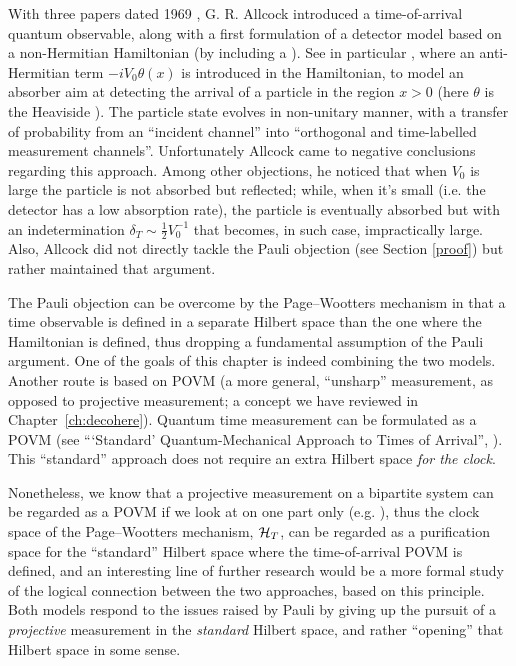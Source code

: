 With three papers dated 1969 \parencite{Allcock-1, Allcock-2, Allcock-3}, G. R. Allcock
introduced a time-of-arrival quantum observable,
along with a first formulation of a detector model based on a non-Hermitian
Hamiltonian (by including a ).
See in particular \cite[\S II-IV]{Allcock-2}, where an anti-Hermitian term
$-iV_0\theta(x)$ is introduced in the Hamiltonian,
to model an absorber aim at detecting
the arrival of a particle in the region $x>0$
(here $\theta$ is the Heaviside ).
The particle state evolves
in non-unitary manner, with a transfer of probability
from an ``incident channel''
into ``orthogonal and time-labelled measurement channels''.
Unfortunately Allcock came to negative conclusions regarding this approach.
Among other objections, he noticed that when $V_0$ is large the particle is not absorbed but reflected;
while, when it's small (i.e. the detector has a low absorption rate), the particle is eventually absorbed but
with an indetermination $\delta_T \sim \frac{1}{2}V_{0}^{-1}$
that becomes, in such case, impractically large.
Also, Allcock did not directly tackle the Pauli objection (see Section \ref{proof})
but rather maintained that argument.

The Pauli objection can be overcome by the Page--Wootters mechanism
in that a time observable is defined in a separate Hilbert space
than the one where the Hamiltonian is defined,
thus dropping a fundamental assumption of the Pauli argument.
One of the goals of this chapter
is indeed combining the two models. Another route is based on POVM
(a more general, ``unsharp'' measurement, as opposed to projective measurement; a concept we have reviewed in Chapter~\ref{ch:decohere}).
Quantum time measurement can be formulated as a POVM
(see ```Standard' Quantum-Mechanical Approach to Times of Arrival'', \cite{TQM1:Standard}).
This ``standard'' approach does not require an extra Hilbert space \emph{for the clock}.

Nonetheless, we know that a projective measurement on a bipartite system
can be regarded as a POVM
if we look at
on one part only (e.g. \cite{Paris2012}),
thus the clock space of the Page--Wootters mechanism, $\mathcal{H}_T$,
can be regarded as a purification space \parencite{Paris2012} for the ``standard''
Hilbert space where the time-of-arrival POVM is defined,
and an interesting line of further research would be a more formal
study of the logical connection between the two approaches, based on this principle.
Both models respond to the issues raised by Pauli
by giving up
the pursuit of
a \emph{projective} measurement in the \emph{standard} Hilbert space,
and rather ``opening'' that Hilbert space in some sense.

